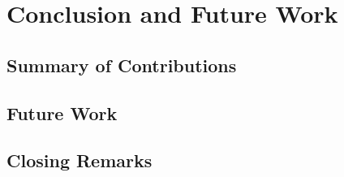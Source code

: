 \chapter{Conclusion and Future Work}


\section{Summary of Contributions}




\section{Future Work}




\section{Closing Remarks}







